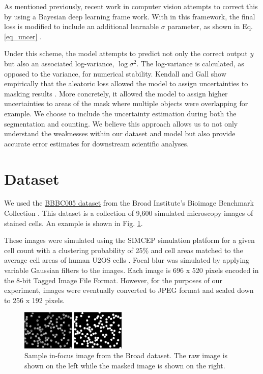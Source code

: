 \documentclass[10pt,twocolumn,letterpaper]{article}
\begin{document}
As mentioned previously, recent work in computer vision attempts to correct this by using a Bayesian deep learning frame work. With in this framework, the final loss is modified to include an additional learnable $\sigma$ parameter, as shown in Eq. \ref{eq_uncer} \cite{bayes_uncer_2017}.  

Under this scheme, the model attempts to predict not only the correct output $y$ but also an associated log-variance, $\log{\sigma^2}$.
The log-variance is calculated, as opposed to the variance, for numerical stability.
Kendall and Gall show empirically that the aleatoric loss allowed the model to assign uncertainties to masking results \cite{bayes_uncer_2017}. More concretely, it allowed the model to assign higher uncertainties to areas of the mask where multiple objects were overlapping for example. We choose to include the uncertainty estimation during both the segmentation and counting. We believe this approach allows us to not only understand the weaknesses within our dataset and model but also provide accurate error estimates for downstream scientific analyses. 

\section{Dataset}
We used the \href{https://data.broadinstitute.org/bbbc/BBBC005/}{BBBC005 dataset} from the Broad Institute's Bioimage Benchmark Collection \cite{bbbc}. This dataset is a collection of 9,600 simulated microscopy images of stained cells. An example is shown in Fig. \ref{fig_broad}.

These images were simulated using the SIMCEP simulation platform for a given cell count with a clustering probability of 25\% and cell areas matched to the average cell areas of human U2OS cells \cite{simcep1, simcep2}.
Focal blur was simulated by applying variable Gaussian filters to the images. Each image is 696 x 520 pixels encoded in the 8-bit Tagged Image File Format.
However, for the purposes of our experiment, images were eventually converted to JPEG format and scaled down to 256 x 192 pixels.

\begin{figure}[!t]
\centering
\includegraphics[width=0.45\textwidth]{Picture1}
\caption{Sample in-focus image from the Broad dataset. The raw image is shown on the left while the masked image is shown on the right.}
\label{fig_broad}
\end{figure}
\end{document}
